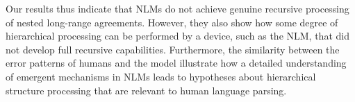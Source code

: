 Our results thus indicate that NLMs do not achieve genuine recursive processing of nested long-range agreements. However, they also show how some degree of hierarchical processing can be performed by a device, such as the NLM, that did not develop full recursive capabilities. Furthermore, the similarity between the error patterns of humans and the model illustrate how a detailed understanding of emergent mechanisms in NLMs leads to hypotheses about hierarchical structure processing that are relevant to human language parsing.